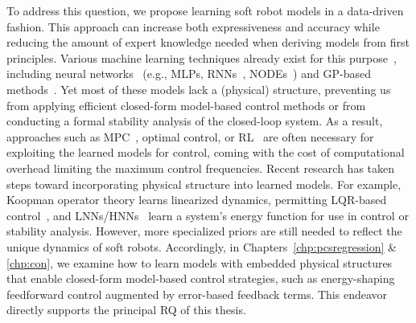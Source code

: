 To address this question, we propose learning soft robot models in a data-driven fashion. This approach can increase both expressiveness and accuracy while reducing the amount of expert knowledge needed when deriving models from first principles. Various machine learning techniques already exist for this purpose~\citep{armanini2023soft, kim2021review, chen2024data}, including neural networks~\citep{thuruthel2017learning} (e.g., \glspl{MLP}, \glspl{RNN}~\citep{schafke2024learning}, \glspl{NODE}~\citep{chen2018neural, kidger2021neural}) and \gls{GP}-based methods~\citep{sabelhaus2021gaussian}. Yet most of these models lack a (physical) structure, preventing us from applying efficient closed-form model-based control methods or from conducting a formal stability analysis of the closed-loop system. As a result, approaches such as \gls{MPC}~\citep{gillespie2018learning, alora2023robust, schafke2024learning}, optimal control, or \gls{RL}~\citep{thuruthel2018model} are often necessary for exploiting the learned models for control, coming with the cost of computational overhead limiting the maximum control frequencies.
%
Recent research has taken steps toward incorporating physical structure into learned models. For example, Koopman operator theory learns linearized dynamics, permitting \gls{LQR}-based control~\citep{bruder2020data}, and \glspl{LNN}/\glspl{HNN}~\citep{lutter2019deep} learn a system’s energy function for use in control or stability analysis. However, more specialized priors are still needed to reflect the unique dynamics of soft robots. Accordingly, in Chapters~\ref{chp:pcsregression} \& \ref{chp:con}, we examine how to learn models with embedded physical structures that enable closed-form model-based control strategies, such as energy-shaping feedforward control augmented by error-based feedback terms. This endeavor directly supports the principal \gls{RQ} of this thesis.



